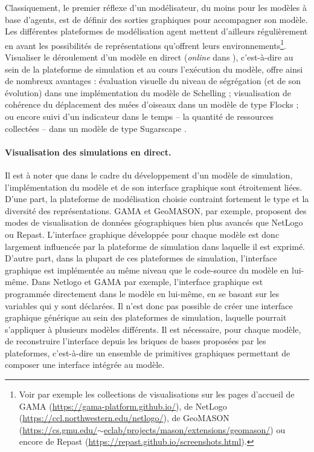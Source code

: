 Classiquement, le premier réflexe d'un modélisateur, du moins pour les modèles à base d'agents, est de définir des sorties graphiques pour accompagner son modèle.
Les différentes plateformes de modélisation agent mettent d'ailleurs régulièrement en avant les possibilités de représentations qu'offrent leurs environnements\footnote{
	Voir par exemple les collections de visualisations sur les pages d'accueil de GAMA (\href{https://gama-platform.github.io/}{https://gama-platform.github.io/}), de NetLogo (\href{https://ccl.northwestern.edu/netlogo/}{https://ccl.northwestern.edu/netlogo/}), de GeoMASON (\href{https://cs.gmu.edu/~eclab/projects/mason/extensions/geomason/}{https://cs.gmu.edu/$\sim$eclab/projects/mason/extensions/geomason/}) ou encore de Repast (\href{https://repast.github.io/screenshots.html}{https://repast.github.io/screenshots.html}).
}.
Visualiser le déroulement d'un modèle \og en direct\fg{} (\og \textit{online}\fg{} dans \cite{grignard_agent-based_2017}), c'est-à-dire au sein de la plateforme de simulation et au cours l'exécution du modèle, offre ainsi de nombreux avantages : évaluation visuelle du niveau de ségrégation (et de son évolution) dans une implémentation du modèle de Schelling ; visualisation de cohérence du déplacement des nuées d'oiseaux dans un modèle de type \og Flocks\fg{} \autocite{reynolds_flocks_1987} ; ou encore suivi d'un indicateur dans le temps -- la quantité de ressources collectées -- dans un modèle de type \og Sugarscape\fg{} \autocite{epstein_growing_1996}.

\paragraph{Visualisation des simulations en direct.}

Il est à noter que dans le cadre du développement d'un modèle de simulation, l'implémentation du modèle et de son interface graphique sont étroitement liées.
D'une part, la plateforme de modélisation choisie contraint fortement le type et la diversité des représentations.
GAMA et GeoMASON, par exemple, proposent des modes de visualisation de données géographiques bien plus avancés que NetLogo ou Repast.
L'interface graphique développée pour chaque modèle est donc largement influencée par la plateforme de simulation dans laquelle il est exprimé.
D'autre part, dans la plupart de ces plateformes de simulation, l'interface graphique est implémentée au même niveau que le code-source du modèle en lui-même.
Dans Netlogo et GAMA par exemple, l'interface graphique est programmée directement dans le modèle en lui-même, en se basant sur les variables qui y sont déclarées.
Il n'est donc pas possible de créer une interface graphique générique au sein des plateformes de simulation, laquelle pourrait s'appliquer à plusieurs modèles différents.
Il est nécessaire, pour chaque modèle, de reconstruire l'interface depuis les briques de bases proposées par les plateformes, c'est-à-dire un ensemble de primitives graphiques permettant de composer une interface intégrée au modèle.

